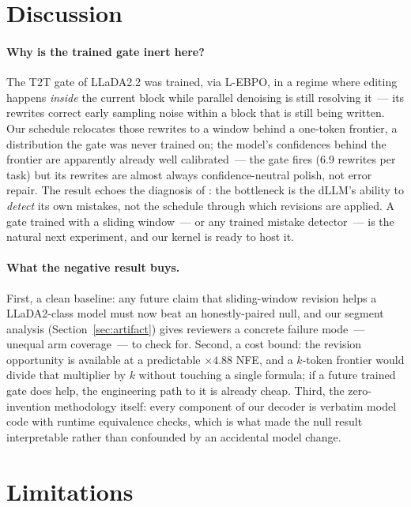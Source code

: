 \section{Discussion}\label{sec:discussion}

\paragraph{Why is the trained gate inert here?}
The T2T gate of LLaDA2.2 was trained, via L-EBPO, in a regime where editing
happens \emph{inside} the current block while parallel denoising is still
resolving it~--- its rewrites correct early sampling noise within a block that is
still being written. Our schedule relocates those rewrites to a window behind a
one-token frontier, a distribution the gate was never trained on; the model's
confidences behind the frontier are apparently already well calibrated~--- the
gate fires (6.9 rewrites per task) but its rewrites are almost always
confidence-neutral polish, not error repair. The result echoes the diagnosis of
\citet{remeval}: the bottleneck is the dLLM's ability to \emph{detect} its own
mistakes, not the schedule through which revisions are applied. A gate trained
with a sliding window~--- or any trained mistake detector~--- is the natural next
experiment, and our kernel is ready to host it.

\paragraph{What the negative result buys.}
First, a clean baseline: any future claim that sliding-window revision helps a
LLaDA2-class model must now beat an honestly-paired null, and our segment analysis
(Section~\ref{sec:artifact}) gives reviewers a concrete failure mode~--- unequal
arm coverage~--- to check for. Second, a cost bound: the revision opportunity is
available at a predictable $\times 4.88$ NFE, and a $k$-token frontier would
divide that multiplier by $k$ without touching a single formula; if a future
trained gate does help, the engineering path to it is already cheap. Third, the
zero-invention methodology itself: every component of our decoder is verbatim
model code with runtime equivalence checks, which is what made the null result
interpretable rather than confounded by an accidental model change.

\section{Limitations}\label{sec:limitations}


